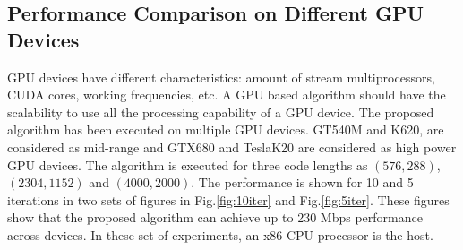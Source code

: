 \documentclass{article}
\begin{document}
\subsection{Performance Comparison on Different GPU Devices}

GPU devices have different characteristics: amount of stream multiprocessors, CUDA cores, working frequencies, etc. A GPU based algorithm should have the scalability to use all the processing capability of a GPU device. The proposed algorithm has been executed on multiple GPU devices. GT540M and K620, are considered as mid-range and GTX680 and TeslaK20 are considered as high power GPU devices. The algorithm is executed for three code lengths as $(576,288)$, $(2304,1152)$ and $(4000,2000)$. The performance is shown for 10 and 5 iterations in two sets of figures in Fig.\ref{fig:10iter} and Fig.\ref{fig:5iter}. These figures show that the proposed algorithm can achieve up to 230 Mbps performance across devices. In these set of experiments, an x86 CPU processor is the host.
\noindent
\end{document}
